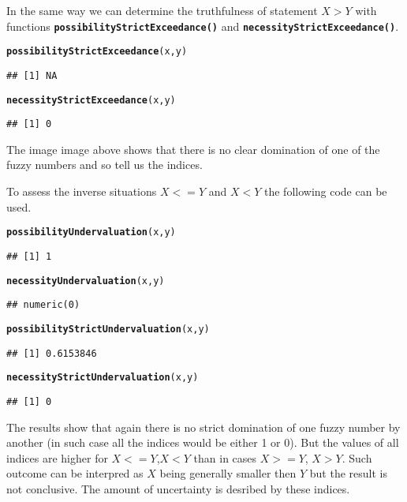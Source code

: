 \documentclass[11pt]{article}\usepackage[]{graphicx}\usepackage[]{color}
\makeatletter
\newcommand{\hlstd}[1]{\textcolor[rgb]{0.345,0.345,0.345}{#1}}%
\newcommand{\hlkwd}[1]{\textcolor[rgb]{0.737,0.353,0.396}{\textbf{#1}}}%
\newenvironment{kframe}{%
 \def\at@end@of@kframe{}%
 \ifinner\ifhmode%
  \def\at@end@of@kframe{\end{minipage}}%
  \begin{minipage}{\columnwidth}%
 \fi\fi%
 \def\FrameCommand##1{\hskip\@totalleftmargin \hskip-\fboxsep
 \colorbox{shadecolor}{##1}\hskip-\fboxsep
     \hskip-\linewidth \hskip-\@totalleftmargin \hskip\columnwidth}%
 \MakeFramed {\advance\hsize-\width
   \@totalleftmargin\z@ \linewidth\hsize
   \@setminipage}}%
 {\par\unskip\endMakeFramed%
 \at@end@of@kframe}
\newenvironment{knitrout}{}{} %
\newcommand{\func}[1]{\texttt{\hlkwd{#1}}}
\makeatother
\begin{document}
In the same way we can determine the truthfulness of statement $X>Y$ with functions \func{possibilityStrictExceedance()} and \func{necessityStrictExceedance()}.
\begin{knitrout}\small
{}\color{fgcolor}\begin{kframe}
\begin{alltt}
\hlkwd{possibilityStrictExceedance}\hlstd{(x,y)}
\end{alltt}
\begin{verbatim}
## [1] NA
\end{verbatim}
\begin{alltt}
\hlkwd{necessityStrictExceedance}\hlstd{(x,y)}
\end{alltt}
\begin{verbatim}
## [1] 0
\end{verbatim}
\end{kframe}
\end{knitrout}
The image image above shows that there is no clear domination of one of the fuzzy numbers and so tell us the indices.

To assess the inverse situations $X<=Y$ and $X<Y$ the following code can be used.
\begin{knitrout}\small
{}\color{fgcolor}\begin{kframe}
\begin{alltt}
\hlkwd{possibilityUndervaluation}\hlstd{(x,y)}
\end{alltt}
\begin{verbatim}
## [1] 1
\end{verbatim}
\begin{alltt}
\hlkwd{necessityUndervaluation}\hlstd{(x,y)}
\end{alltt}
\begin{verbatim}
## numeric(0)
\end{verbatim}
\begin{alltt}
\hlkwd{possibilityStrictUndervaluation}\hlstd{(x,y)}
\end{alltt}
\begin{verbatim}
## [1] 0.6153846
\end{verbatim}
\begin{alltt}
\hlkwd{necessityStrictUndervaluation}\hlstd{(x,y)}
\end{alltt}
\begin{verbatim}
## [1] 0
\end{verbatim}
\end{kframe}
\end{knitrout}
The results show that again there is no strict domination of one fuzzy number by another (in such case all the indices would be either 1 or 0). But the values of all indices are higher for $X<=Y$,$X<Y$ than in cases $X>=Y$, $X>Y$. Such outcome can be interpred as $X$ being generally smaller then $Y$ but the result is not conclusive. The amount of uncertainty is desribed by these indices.
\end{document}
